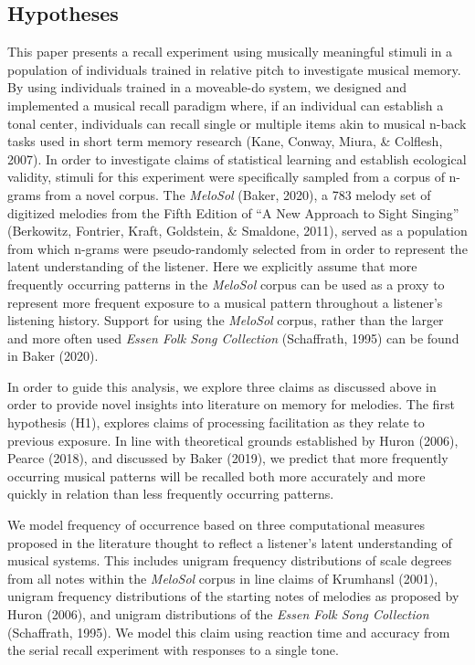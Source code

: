 \documentclass[english,man,floatsintext]{apa6}
\begin{document}
\hypertarget{hypotheses}{%
\subsection{Hypotheses}\label{hypotheses}}

This paper presents a recall experiment using musically meaningful stimuli in a population of individuals trained in relative pitch to investigate musical memory.
By using individuals trained in a moveable-do system, we designed and implemented a musical recall paradigm where, if an individual can establish a tonal center, individuals can recall single or multiple items akin to musical n-back tasks used in short term memory research (Kane, Conway, Miura, \& Colflesh, 2007).
In order to investigate claims of statistical learning and establish ecological validity, stimuli for this experiment were specifically sampled from a corpus of n-grams from a novel corpus.
The \emph{MeloSol} (Baker, 2020), a 783 melody set of digitized melodies from the Fifth Edition of \enquote{A New Approach to Sight Singing} (Berkowitz, Fontrier, Kraft, Goldstein, \& Smaldone, 2011), served as a population from which n-grams were pseudo-randomly selected from in order to represent the latent understanding of the listener.
Here we explicitly assume that more frequently occurring patterns in the \emph{MeloSol} corpus can be used as a proxy to represent more frequent exposure to a musical pattern throughout a listener's listening history.
Support for using the \emph{MeloSol} corpus, rather than the larger and more often used \emph{Essen Folk Song Collection} (Schaffrath, 1995) can be found in Baker (2020).

In order to guide this analysis, we explore three claims as discussed above in order to provide novel insights into literature on memory for melodies.
The first hypothesis (H1), explores claims of processing facilitation as they relate to previous exposure.
In line with theoretical grounds established by Huron (2006), Pearce (2018), and discussed by Baker (2019), we predict that more frequently occurring musical patterns will be recalled both more accurately and more quickly in relation than less frequently occurring patterns.

We model frequency of occurrence based on three computational measures proposed in the literature thought to reflect a listener's latent understanding of musical systems.
This includes unigram frequency distributions of scale degrees from all notes within the \emph{MeloSol} corpus in line claims of Krumhansl (2001), unigram frequency distributions of the starting notes of melodies as proposed by Huron (2006), and unigram distributions of the \emph{Essen Folk Song Collection} (Schaffrath, 1995).
We model this claim using reaction time and accuracy from the serial recall experiment with responses to a single tone.
\end{document}
